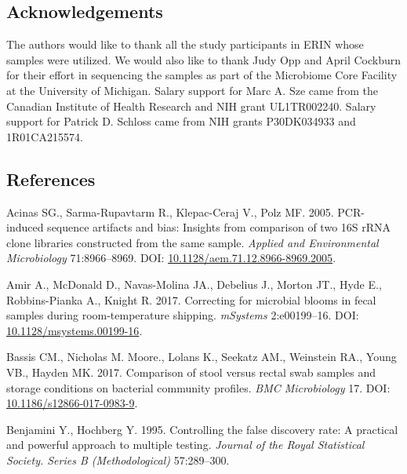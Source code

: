 \documentclass[12pt,]{article}
\begin{document}
\newpage

\subsection{Acknowledgements}\label{acknowledgements}

The authors would like to thank all the study participants in ERIN whose
samples were utilized. We would also like to thank Judy Opp and April
Cockburn for their effort in sequencing the samples as part of the
Microbiome Core Facility at the University of Michigan. Salary support
for Marc A. Sze came from the Canadian Institute of Health Research and
NIH grant UL1TR002240. Salary support for Patrick D. Schloss came from
NIH grants P30DK034933 and 1R01CA215574.

\newpage

\subsection{References}\label{references}

\hypertarget{refs}{}
\hypertarget{ref-Acinas2005}{}
Acinas SG., Sarma-Rupavtarm R., Klepac-Ceraj V., Polz MF. 2005.
PCR-induced sequence artifacts and bias: Insights from comparison of two
16S rRNA clone libraries constructed from the same sample. \emph{Applied
and Environmental Microbiology} 71:8966--8969. DOI:
\href{https://doi.org/10.1128/aem.71.12.8966-8969.2005}{10.1128/aem.71.12.8966-8969.2005}.

\hypertarget{ref-Amir2017}{}
Amir A., McDonald D., Navas-Molina JA., Debelius J., Morton JT., Hyde
E., Robbins-Pianka A., Knight R. 2017. Correcting for microbial blooms
in fecal samples during room-temperature shipping. \emph{mSystems}
2:e00199--16. DOI:
\href{https://doi.org/10.1128/msystems.00199-16}{10.1128/msystems.00199-16}.

\hypertarget{ref-storage_Bassis_2017}{}
Bassis CM., Nicholas M. Moore., Lolans K., Seekatz AM., Weinstein RA.,
Young VB., Hayden MK. 2017. Comparison of stool versus rectal swab
samples and storage conditions on bacterial community profiles.
\emph{BMC Microbiology} 17. DOI:
\href{https://doi.org/10.1186/s12866-017-0983-9}{10.1186/s12866-017-0983-9}.

\hypertarget{ref-benjamini_controlling_1995}{}
Benjamini Y., Hochberg Y. 1995. Controlling the false discovery rate: A
practical and powerful approach to multiple testing. \emph{Journal of
the Royal Statistical Society. Series B (Methodological)} 57:289--300.
\end{document}
